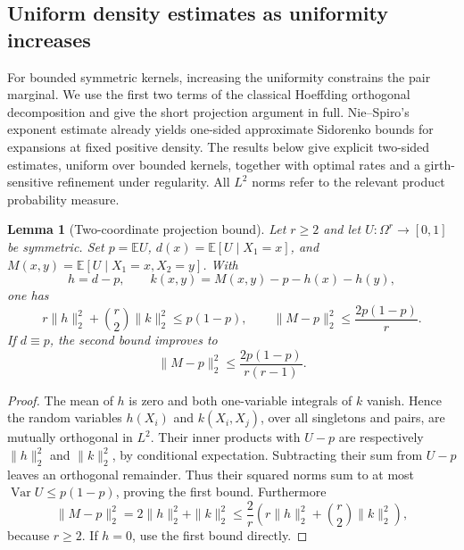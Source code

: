 \documentclass[a4paper,11pt,reqno]{amsart}
\theoremstyle{plain}
\newtheorem{lemma}[theorem]{Lemma}
\theoremstyle{definition}
\theoremstyle{remark}
\begin{document}
\subsection{Uniform density estimates as uniformity increases}

For bounded symmetric kernels, increasing the uniformity constrains
the pair marginal.  We use the first two terms of the classical
Hoeffding orthogonal decomposition \citep{hoeffding1948} and give the
short projection argument in full.
Nie--Spiro's exponent estimate
\citep[Theorem~1.13]{niespiro2025} already yields one-sided
approximate Sidorenko bounds for expansions at fixed positive
density.  The results below give explicit two-sided estimates,
uniform over bounded kernels, together with optimal rates and a
girth-sensitive refinement under regularity.
All $L^2$ norms refer to the relevant product probability measure.

\begin{lemma}[Two-coordinate projection bound]
\label{density-projection-bound}
Let $r\ge2$ and let $U:\Omega^r\to[0,1]$ be symmetric.  Set
$p=\mathbb EU$, $d(x)=\mathbb E[U\mid X_1=x]$, and
$M(x,y)=\mathbb E[U\mid X_1=x,X_2=y]$.  With
\[
 h=d-p,\qquad k(x,y)=M(x,y)-p-h(x)-h(y),
\]
one has
\begin{equation}\label{density-hoeffding}
 r\|h\|_2^2+\binom r2\|k\|_2^2\le p(1-p),
 \qquad
 \|M-p\|_2^2\le\frac{2p(1-p)}r.
\end{equation}
If $d\equiv p$, the second bound improves to
\begin{equation}\label{density-regular-projection}
 \|M-p\|_2^2\le\frac{2p(1-p)}{r(r-1)}.
\end{equation}
\end{lemma}
\begin{proof}
The mean of $h$ is zero and both one-variable integrals of $k$
vanish.  Hence the random variables $h(X_i)$ and $k(X_i,X_j)$,
over all singletons and pairs, are mutually orthogonal in $L^2$.
Their inner products with $U-p$ are respectively $\|h\|_2^2$
and $\|k\|_2^2$, by conditional expectation.  Subtracting their
sum from $U-p$ leaves an orthogonal remainder.  Thus their squared
norms sum to at most $\operatorname{Var}U\le p(1-p)$, proving
the first bound.  Furthermore
\[
 \|M-p\|_2^2=2\|h\|_2^2+\|k\|_2^2
 \le\frac2r\left(r\|h\|_2^2+\binom r2\|k\|_2^2\right),
\]
because $r\ge2$.  If $h=0$, use the first bound directly.
\end{proof}
\end{document}
